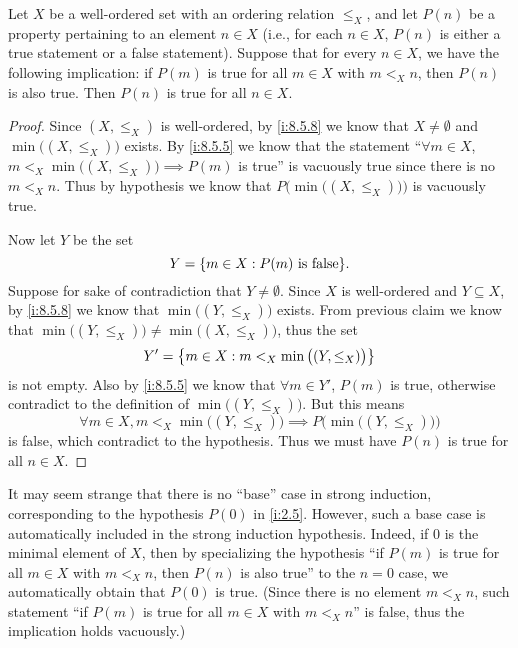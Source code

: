 \begin{prop}\label{i:8.5.10}
  Let \(X\) be a well-ordered set with an ordering relation \(\leq_X\), and let \(P(n)\) be a property pertaining to an element \(n \in X\)
  (i.e., for each \(n \in X\), \(P(n)\) is either a true statement or a false statement).
  Suppose that for every \(n \in X\), we have the following implication:
  if \(P(m)\) is true for all \(m \in X\) with \(m <_X n\), then \(P(n)\) is also true.
  Then \(P(n)\) is true for all \(n \in X\).
\end{prop}

\begin{proof}
  Since \((X, \leq_X)\) is well-ordered, by \cref{i:8.5.8} we know that \(X \neq \emptyset\) and \(\min\big((X, \leq_X)\big)\) exists.
  By \cref{i:8.5.5} we know that the statement ``\(\forall m \in X\), \(m <_X \min\big((X, \leq_X)\big) \implies P(m)\) is true'' is vacuously true since there is no \(m <_X n\).
  Thus by hypothesis we know that \(P\Big(\min\big((X, \leq_X)\big)\Big)\) is vacuously true.

  Now let \(Y\) be the set
  \[
    Y = \set{m \in X : P(m) \text{ is false}}.
  \]
  Suppose for sake of contradiction that \(Y \neq \emptyset\).
  Since \(X\) is well-ordered and \(Y \subseteq X\), by \cref{i:8.5.8} we know that \(\min\big((Y, \leq_X)\big)\) exists.
  From previous claim we know that \(\min\big((Y, \leq_X)\big) \neq \min\big((X, \leq_X)\big)\), thus the set
  \[
    Y' = \left\lbrace m \in X : m <_X \min\big((Y, \leq_X)\big)\right\rbrace
  \]
  is not empty.
  Also by \cref{i:8.5.5} we know that \(\forall m \in Y'\), \(P(m)\) is true, otherwise contradict to the definition of \(\min\big((Y, \leq_X)\big)\).
  But this means
  \[
    \forall m \in X, m <_X \min\big((Y, \leq_X)\big) \implies P\Big(\min\big((Y, \leq_X)\big)\Big)
  \]
  is false, which contradict to the hypothesis.
  Thus we must have \(P(n)\) is true for all \(n \in X\).
\end{proof}

\begin{rmk}\label{i:8.5.11}
  It may seem strange that there is no ``base'' case in strong induction, corresponding to the hypothesis \(P(0)\) in \cref{i:2.5}.
  However, such a base case is automatically included in the strong induction hypothesis.
  Indeed, if \(0\) is the minimal element of \(X\), then by specializing the hypothesis ``if \(P(m)\) is true for all \(m \in X\) with \(m <_X n\), then \(P(n)\) is also true'' to the \(n = 0\) case, we automatically obtain that \(P(0)\) is true.
  (Since there is no element \(m <_X n\), such statement ``if \(P(m)\) is true for all \(m \in X\) with \(m <_X n\)'' is false, thus the implication holds vacuously.)
\end{rmk}

